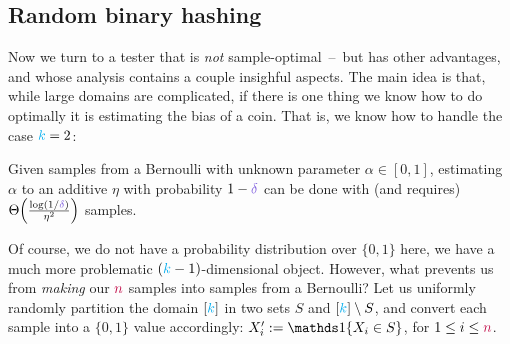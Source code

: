 \subsection{Random binary hashing} 
	\label{ssec:random:hashing}
Now we turn to a tester that is \emph{not} sample-optimal~--~but has other advantages, and whose analysis contains a couple insighful aspects. The main idea is that, while large domains are complicated, if there is one thing we know how to do optimally it is estimating the bias of a coin. That is, we know how to handle the case ${\textcolor{cyan}{k}}=2$:
\begin{fact}
  \label{lemma:bias:coin}
  Given \iid samples from a Bernoulli with unknown parameter $\alpha\in[0,1]$, estimating $\alpha$ to an additive $\eta$ with probability $1-\errprob$ can be done with (and requires) $\bigTheta{\frac{\log(1/\errprob)}{\eta^2}}$ samples.
\end{fact} 
Of course, we do not have a probability distribution over $\{0,1\}$ here, we have a much more problematic $({\textcolor{cyan}{k}}-1)$-dimensional object. However, what prevents us from \emph{making} our ${\textcolor{purple}{n}}$ samples into \iid samples from a Bernoulli? Let us uniformly randomly partition the domain $[{\textcolor{cyan}{k}}]$ in two sets $S$ and $[{\textcolor{cyan}{k}}]\setminus S$, and convert each sample into a $\{0,1\}$ value accordingly: $X'_i \eqdef \indic{X_i\in S}$, for $1\leq i\leq {\textcolor{purple}{n}}$.

